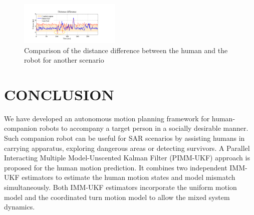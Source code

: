 \documentclass[journal]{IEEEtran}
\begin{document}
        \begin{figure} [t]
\centering	\includegraphics[width=0.43\textwidth]{figures/ddf}
		\caption{Comparison of the distance difference between the human and the robot for another scenario}
		\label{fig:constraint_violation}
\end{figure}	\section{CONCLUSION}\label{sec:conclusion}
	We have developed an autonomous motion planning framework for human-companion robots to accompany a target person in a socially desirable manner.
	Such companion robot can be useful for SAR scenarios by assisting humans in carrying apparatus, exploring dangerous areas or detecting survivors.
	A Parallel Interacting Multiple Model-Unscented Kalman Filter (PIMM-UKF) approach
    is proposed for the human motion prediction. 
    It combines two independent IMM-UKF estimators to estimate the human motion states and model mismatch simultaneously.
    Both IMM-UKF estimators incorporate the uniform motion model and the coordinated turn motion model to allow the mixed system dynamics. 
\end{document}
